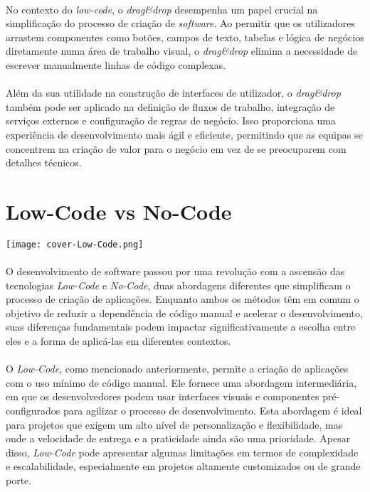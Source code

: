 \documentclass[pdflatex,sn-mathphys-num]{sn-jnl}
\theoremstyle{thmstyleone}
\theoremstyle{thmstyletwo}
\theoremstyle{thmstylethree}
\begin{document}
\paragraph{}No contexto do \textit{low-code}, o \textit{drag\&drop} desempenha um papel crucial na simplificação do processo de criação de \textit{software}. Ao permitir que os utilizadores arrastem componentes como botões, campos de texto, tabelas e lógica de negócios diretamente numa área de trabalho visual, o \textit{drag\&drop} elimina a necessidade de escrever manualmente linhas de código complexas.

\paragraph{}Além da sua utilidade na construção de interfaces de utilizador, o \textit{drag\&drop} também pode ser aplicado na definição de fluxos de trabalho, integração de serviços externos e configuração de regras de negócio. Isso proporciona uma experiência de desenvolvimento mais ágil e eficiente, permitindo que as equipas se concentrem na criação de valor para o negócio em vez de se preocuparem com detalhes técnicos.


\section{Low-Code vs No-Code}\label{sec3}


\begin{center}
\texttt{[image: cover-Low-Code.png]}
\end{center}

\paragraph{}O desenvolvimento de software passou por uma revolução com a ascensão das tecnologias \textit{Low-Code} e \textit{No-Code}, duas abordagens diferentes que simplificam o processo de criação de aplicações. Enquanto ambos os métodos têm em comum o objetivo de reduzir a dependência de código manual e acelerar o desenvolvimento, suas diferenças fundamentais podem impactar significativamente a escolha entre eles e a forma de aplicá-las em diferentes contextos.\cite{bib14}

\paragraph{}O \textit{Low-Code}, como mencionado anteriormente, permite a criação de aplicações com o uso mínimo de código manual. Ele fornece uma abordagem intermediária, em que os desenvolvedores podem usar interfaces visuais e componentes pré-configurados para agilizar o processo de desenvolvimento. Esta abordagem é ideal para projetos que exigem um alto nível de personalização e flexibilidade, mas onde a velocidade de entrega e a praticidade ainda são uma prioridade. Apesar disso, \textit{Low-Code} pode apresentar algumas limitações em termos de complexidade e escalabilidade, especialmente em projetos altamente customizados ou de grande porte.\cite{bib14}
\end{document}
